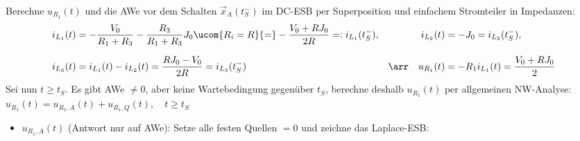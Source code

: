 \documentclass[ngerman,10pt,a4paper]{article}%
\begin{document}
\noindent Berechne $u_{R_1}(t)$ und die AWe vor dem Schalten $\vec{x}_A(t_S^-)$ im DC-ESB per Superposition und einfachem Stromteiler in Impedanzen:
\begin{align*}%
	i_{L_1}(t)&=-\frac{V_0}{R_1+R_3}-\frac{R_3}{R_1+R_3}J_0\ucom{R_i=R}{=}-\frac{V_0+RJ_0}{2R}=:i_{L_1}(t_S^-),&i_{L_2}(t)&=-J_0=i_{L_2}(t_S^-),\\[2.5mm]%
%
	i_{L_3}(t)&=i_{L_1}(t)-i_{L_2}(t)=\frac{RJ_0-V_0}{2R}=i_{L_3}(t_S^-)&\arr\quad u_{R_1}(t)&=-R_1i_{L_1}(t)=\frac{V_0+RJ_0}{2}%
\end{align*}%
%
Sei nun $t\geq t_S$. Es gibt AWe $\neq 0$, aber keine Wartebedingung gegenüber $t_S$, berechne deshalb $u_{R_1}(t)$ per allgemeinen NW-Analyse: $u_{R_1}(t)=u_{R_1,A}(t)+u_{R_1,Q}(t),\quad t\geq t_S$
%
\begin{itemize}%
	\item $u_{R_1,A}(t)$ (Antwort nur auf AWe): Setze alle festen Quellen $=0$ und zeichne das Laplace-ESB:
	

\end{itemize}
\end{document}
